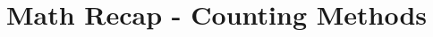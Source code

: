 \documentclass[8pt,usepdftitle=false]{beamer}
\begin{document}


























\section{Math Recap - Counting Methods}
\end{document}
